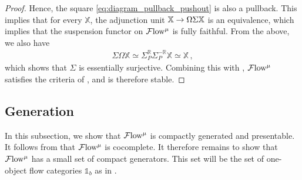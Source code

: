 \documentclass[10pt]{amsart}
\numberwithin{equation}{section}
\theoremstyle{definition}
\newcommand{\Flow}{\cF\mathrm{low}\vphantom{w}}
\newcommand{\bR}{\mathbb{R}}
\newcommand{\bX}{\mathbb{X}}
\newcommand{\bOne}{\mathbb{1}}
\newcommand{\cF}{\mathcal{F}}
\renewcommand{\to}{\mathchoice{\longrightarrow}{\rightarrow}{}{}}
\begin{document}
\begin{proof}
  Hence, the square \eqref{eq:diagram_pullback_pushout} is also a pullback.
  This implies that for every $\bX$, the adjunction unit $\bX \to \Omega \Sigma \bX$ is an equivalence, which implies that the suspension functor on $\Flow^{\mu}$ is fully faithful.
  From the above, we also have
	\begin{align*}
		\Sigma \Omega \bX \simeq \Sigma^{\bR}_{P} \Sigma^{-\bR}_{P} \bX \simeq \bX \,,
	\end{align*}
	which shows that $\Sigma$ is essentially surjective.
  Combining this with , $\Flow^{\mu}$ satisfies the criteria of \cite*[Corollary 1.4.2.27]{HA}, and is therefore stable.
\end{proof}

\subsection{Generation} \label{sec:presentability}

In this subsection, we show that $\Flow^{\mu}$ is compactly generated and presentable.
It follows from  that $\Flow^{\mu}$ is cocomplete.
It therefore remains to show that $\Flow^{\mu}$ has a small set of compact generators.
This set will be the set of one-object flow categories $\bOne_{b}$ as in .
\end{document}
